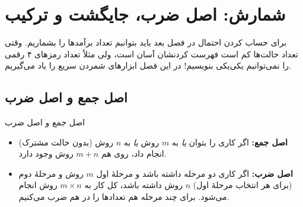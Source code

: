\chapter{شمارش: اصل ضرب، جایگشت و ترکیب}
\label{hs:ch2}


برای حساب کردن احتمال در فصل بعد باید بتوانیم تعداد برآمدها را بشماریم. وقتی تعداد حالت‌ها کم است فهرست کردنشان آسان است، ولی مثلاً تعداد رمزهای ۴ رقمی را نمی‌توانیم یکی‌یکی بنویسیم! در این فصل ابزارهای شمردن سریع را یاد می‌گیریم.

\section{اصل جمع و اصل ضرب}

\begin{theorem}[label=hs:thm:counting]{اصل جمع و اصل ضرب}
\begin{itemize}
  \item \textbf{اصل جمع:} اگر کاری را بتوان \emph{یا} به $m$ روش \emph{یا} به $n$ روش (بدون حالت مشترک) انجام داد، روی هم $m+n$ روش وجود دارد.
  \item \textbf{اصل ضرب:} اگر کاری دو مرحله داشته باشد و مرحلهٔ اول $m$ روش و مرحلهٔ دوم (برای هر انتخاب مرحلهٔ اول) $n$ روش داشته باشد، کل کار به $m\times n$ روش انجام می‌شود. برای چند مرحله هم تعدادها را در هم ضرب می‌کنیم.
\end{itemize}
\end{theorem}

